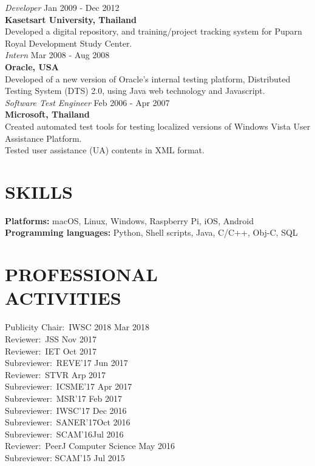 \documentclass[margin, 10pt]{res} %
\begin{document}
\begin{resume}
{\sl Developer} \hfill Jan 2009 - Dec 2012 \\
\textbf{Kasetsart University, Thailand}\\
Developed a digital repository, and training/project tracking system for Puparn Royal Development Study Center. \vspace{3mm} \\
{\sl Intern} \hfill Mar 2008 - Aug 2008 \\
\textbf{Oracle, USA}\\
Developed of a new version of Oracle's internal testing platform, Distributed  
Testing System (DTS) 2.0, using Java web technology and Javascript. \vspace{3mm} \\
{\sl Software Test Engineer} \hfill Feb 2006 - Apr 2007\\
\textbf{Microsoft, Thailand}\\
Created automated test tools for testing localized versions of Windows Vista User Assistance Platform.\\
Tested user assistance (UA) contents in XML format.


\section{SKILLS}
\textbf{Platforms: } macOS, Linux, Windows, Raspberry Pi, iOS, Android \\
\textbf{Programming languages: } Python, Shell scripts, Java, C/C++, Obj-C, SQL


\section{PROFESSIONAL \\ ACTIVITIES} 
Publicity Chair:~IWSC 2018 \hfill Mar 2018 \\
Reviewer:~JSS \hfill Nov 2017 \\
Reviewer:~IET \hfill Oct 2017 \\
Subreviewer:~REVE'17 \hfill Jun 2017 \\
Reviewer:~STVR \hfill Arp 2017 \\
Subreviewer:~ICSME'17 \hfill Apr 2017 \\
Subreviewer:~MSR'17 \hfill Feb 2017 \\
Subreviewer:~IWSC'17 \hfill Dec 2016 \\
Subreviewer:~SANER'17\hfill Oct 2016 \\
Subreviewer:~SCAM'16\hfill Jul 2016 \\
Reviewer:~PeerJ Computer Science \hfill May 2016 \\
Subreviewer: SCAM'15 \hfill Jul 2015


\end{resume}
\end{document}
